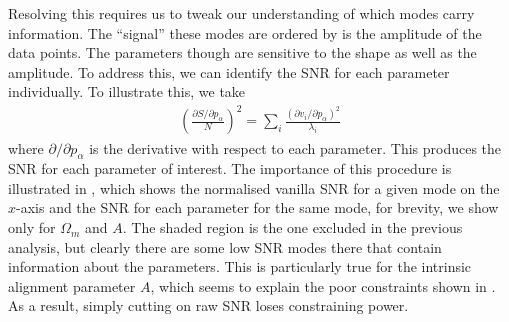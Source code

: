\documentclass[twocolumn]{\docclass}
\newcommand\be{\begin{equation}}
\newcommand\ee{\end{equation}}
\def\bea{\begin{eqnarray}}
\def\eea{\end{eqnarray}}
\begin{document}
	Resolving this requires us to tweak our understanding of which modes carry information. The ``signal'' these modes are ordered by is the amplitude of the data points.  The parameters though are sensitive to the shape as well as the amplitude.
	To address this, we can identify the SNR for each parameter individually. To illustrate this, we take
	\bea
	\left(\frac{\partial S/\partial p_\alpha}{N}\right)^2 = \sum_{i} \frac{(\partial v_i / \partial p_\alpha)^2}{\lambda_i}
	\eea
	where $\partial /\partial p_\alpha$ is the derivative with respect to each parameter. This produces the SNR for each parameter of interest. The importance of this procedure is illustrated in , which shows the normalised vanilla SNR for a given mode on the $x$-axis and the SNR for each parameter for the same mode, for brevity, we show only for $\Omega_m$ and $A$. The shaded region is the one excluded in the previous analysis, but clearly there are some low SNR modes there that contain information about the parameters. This is particularly true for the intrinsic alignment parameter $A$, which seems to explain the poor constraints shown in . As a result, simply cutting on raw SNR loses constraining power. 
	
\end{document}
